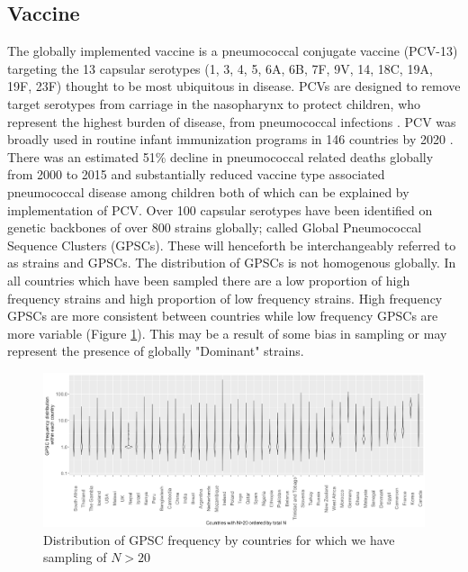 \documentclass{article}
\begin{document}
\subsection{Vaccine} 
The globally implemented vaccine is a pneumococcal conjugate vaccine (PCV-13) targeting the 13 capsular serotypes (1, 3, 4, 5, 6A, 6B, 7F, 9V, 14, 18C, 19A, 19F, 23F) thought to be most ubiquitous in disease\cite{VaccineInformationStatement2019}. PCVs are designed to remove target serotypes from carriage in the nasopharynx to protect children, who represent the highest burden of disease, from pneumococcal infections \cite{bogaertStreptococcusPneumoniaeColonisation2004,wyllieMolecularSurveillanceStreptococcus2016}. PCV was broadly used in routine infant immunization programs in 146 countries by 2020 \cite{VaccineInformationStatement2019}. There was an estimated 51\% decline in pneumococcal related deaths globally from 2000 to 2015 and substantially reduced vaccine type associated pneumococcal disease among children both of which can be explained by implementation of PCV\cite{wahlBurdenStreptococcusPneumoniae2018, pilishviliSustainedReductionsInvasive2010,vongottbergEffectsVaccinationInvasive2014}. Over 100 capsular serotypes have been identified on genetic backbones of over 800 strains globally; called Global Pneumococcal Sequence Clusters (GPSCs)\cite{gladstoneInternationalGenomicDefinition2019b}. These will henceforth be interchangeably referred to as strains and GPSCs. The distribution of  GPSCs is not homogenous globally. In all countries which have been sampled there are a low proportion of high frequency strains and high proportion of low frequency strains. High frequency GPSCs are more consistent between countries while low frequency GPSCs are more variable (Figure \ref{fig:gpscfreqdist}). This may be a result of some bias in sampling or may represent the presence of globally "Dominant" strains\cite{gladstoneInternationalGenomicDefinition2019b}.  
\begin{figure}
    \centering
    \includegraphics[width=\textwidth]{08MAR21_gpscfreqDistribution.png}
    \caption{Distribution of GPSC frequency by countries for which we have sampling of $N>20$}
    \label{fig:gpscfreqdist}
\end{figure} 
\end{document}
